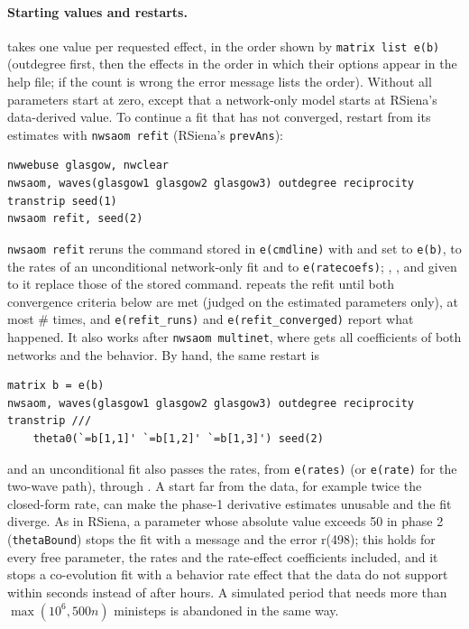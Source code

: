 \paragraph{Starting values and restarts.}  takes one value per requested effect, in the order shown by \texttt{matrix list e(b)} (outdegree first, then the effects in the order in which their options appear in the help file; if the count is wrong the error message lists the order). Without  all parameters start at zero, except that a network-only model starts  at RSiena's data-derived value. To continue a fit that has not converged, restart from its estimates with \texttt{nwsaom refit} (RSiena's \texttt{prevAns}):
\begin{lstlisting}
nwwebuse glasgow, nwclear
nwsaom, waves(glasgow1 glasgow2 glasgow3) outdegree reciprocity transtrip seed(1)
nwsaom refit, seed(2)
\end{lstlisting}
\texttt{nwsaom refit} reruns the command stored in \texttt{e(cmdline)} with  and  set to \texttt{e(b)},  to the rates of an unconditional network-only fit and  to \texttt{e(ratecoefs)}; , ,  and  given to it replace those of the stored command.  repeats the refit until both convergence criteria below are met (judged on the estimated parameters only), at most \# times, and \texttt{e(refit\_runs)} and \texttt{e(refit\_converged)} report what happened. It also works after \texttt{nwsaom multinet}, where  gets all coefficients of both networks and the behavior. By hand, the same restart is
\begin{lstlisting}
matrix b = e(b)
nwsaom, waves(glasgow1 glasgow2 glasgow3) outdegree reciprocity transtrip ///
    theta0(`=b[1,1]' `=b[1,2]' `=b[1,3]') seed(2)
\end{lstlisting}
and an unconditional fit also passes the rates, from \texttt{e(rates)} (or \texttt{e(rate)} for the two-wave path), through .
A start far from the data, for example twice the closed-form rate, can make the phase-1 derivative estimates unusable and the fit diverge. As in RSiena, a parameter whose absolute value exceeds 50 in phase 2 (\texttt{thetaBound}) stops the fit with a message and the error r(498); this holds for every free parameter, the rates and the rate-effect coefficients included, and it stops a co-evolution fit with a behavior rate effect that the data do not support within seconds instead of after hours. A simulated period that needs more than $\max(10^6, 500n)$ ministeps is abandoned in the same way.

